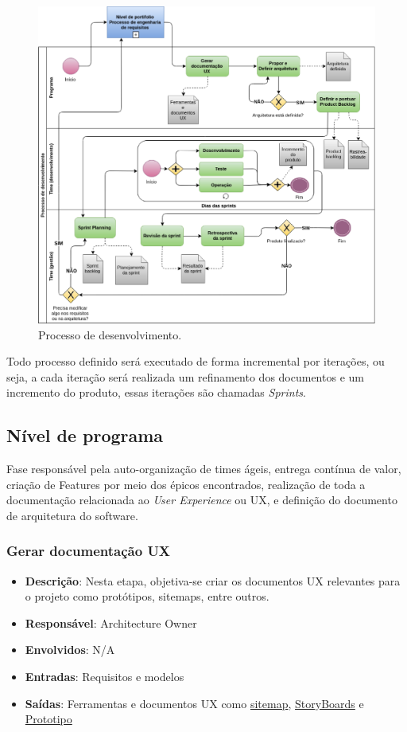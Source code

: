 \begin{figure}[h!]
	\centering
  \includegraphics[keepaspectratio=true,scale=0.5]{figuras/desenvolvimento.eps}
  \caption{Processo de desenvolvimento.}
	\label{fig:desenvolvimento}
\end{figure}

Todo processo definido será executado de forma incremental por iterações, ou seja, a cada iteração será realizada um
refinamento dos documentos e um incremento do produto, essas iterações são chamadas \textit{Sprints}.

\subsection{Nível de programa}

Fase responsável pela auto-organização de times ágeis, entrega contínua de valor, criação de Features por meio dos épicos encontrados, realização de toda a documentação relacionada ao \textit{User Experience} ou UX, e definição do documento de arquitetura do software.

\subsubsection{Gerar documentação UX}

\begin{itemize}
  \item \textbf{Descrição}: Nesta etapa, objetiva-se criar os documentos UX relevantes para o projeto como protótipos, sitemaps, entre outros.
  \item \textbf{Responsável}: Architecture Owner
  \item \textbf{Envolvidos}: N/A
  \item \textbf{Entradas}: Requisitos e modelos
  \item \textbf{Saídas}: Ferramentas e documentos UX como \href{https://victorarnaud.github.io/TBL/sitemap/}{sitemap}, \href{https://victorarnaud.github.io/TBL/storyboards/}{StoryBoards} e \href{https://github.com/VictorArnaud/TBL/wiki/Prot%C3%B3tipo}{Prototipo}
\end{itemize}

